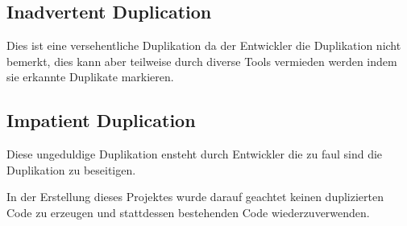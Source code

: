 \subsection{Inadvertent Duplication}
Dies ist eine versehentliche Duplikation da der Entwickler die Duplikation nicht bemerkt,
dies kann aber teilweise durch diverse Tools vermieden werden indem sie erkannte Duplikate markieren.
\subsection{Impatient Duplication}
Diese ungeduldige Duplikation ensteht durch Entwickler die zu faul sind die Duplikation zu beseitigen.

In der Erstellung dieses Projektes wurde darauf geachtet keinen duplizierten Code zu erzeugen und stattdessen bestehenden Code wiederzuverwenden.
